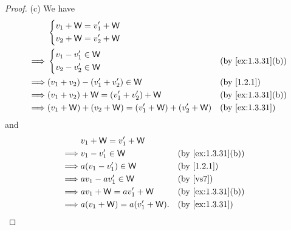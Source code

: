 \begin{proof}{(c)}
  We have
  \begin{align*}
             & \begin{dcases}
      v_1 + \W = v_1' + \W \\
      v_2 + \W = v_2' + \W
    \end{dcases}                                                              \\
    \implies & \begin{dcases}
      v_1 - v_1' \in \W \\
      v_2 - v_2' \in \W
    \end{dcases}                         &  & \text{(by \cref{ex:1.3.31}(b))} \\
    \implies & (v_1 + v_2) - (v_1' + v_2') \in \W                  &  & \text{(by \cref{1.2.1})}        \\
    \implies & (v_1 + v_2) + \W = (v_1' + v_2') + \W               &  & \text{(by \cref{ex:1.3.31}(b))} \\
    \implies & (v_1 + \W) + (v_2 + \W) = (v_1' + \W) + (v_2' + \W) &  & \text{(by \cref{ex:1.3.31})}
  \end{align*}
  and
  \begin{align*}
             & v_1 + \W = v_1' + \W                                             \\
    \implies & v_1 - v_1' \in \W           &  & \text{(by \cref{ex:1.3.31}(b))} \\
    \implies & a(v_1 - v_1') \in \W        &  & \text{(by \cref{1.2.1})}        \\
    \implies & av_1 - av_1' \in \W         &  & \text{(by \ref{vs7})}           \\
    \implies & av_1 + \W = av_1' + \W      &  & \text{(by \cref{ex:1.3.31}(b))} \\
    \implies & a(v_1 + \W) = a(v_1' + \W). &  & \text{(by \cref{ex:1.3.31})}
  \end{align*}
\end{proof}

